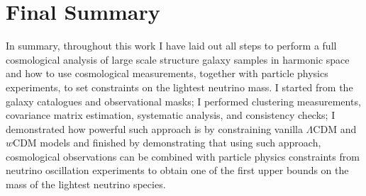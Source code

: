 \section{Final Summary}
In summary, throughout this work I have laid out all steps to perform a full cosmological analysis of large scale structure galaxy samples in harmonic space and how to use cosmological measurements, together with particle physics experiments, to set constraints on the lightest neutrino mass. I started from the galaxy catalogues and observational masks; I performed clustering measurements, covariance matrix estimation, systematic analysis, and consistency checks; I demonstrated how powerful such approach is by constraining vanilla $\Lambda$CDM and $w$CDM models and finished by demonstrating that using such approach, cosmological observations can be combined with particle physics constraints from neutrino oscillation experiments to obtain one of the first upper bounds on the mass of the lightest neutrino species.

\vspace*{\fill}
